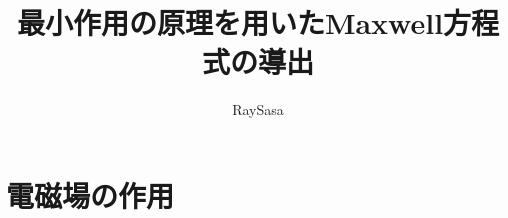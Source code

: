 \documentclass[11pt,titlepage]{ltjsarticle}
\title{最小作用の原理を用いたMaxwell方程式の導出}
\author{RaySasa}
\date{}
\begin{document}
\maketitle
\tableofcontents
\clearpage

\section{電磁場の作用}
\end{document}
